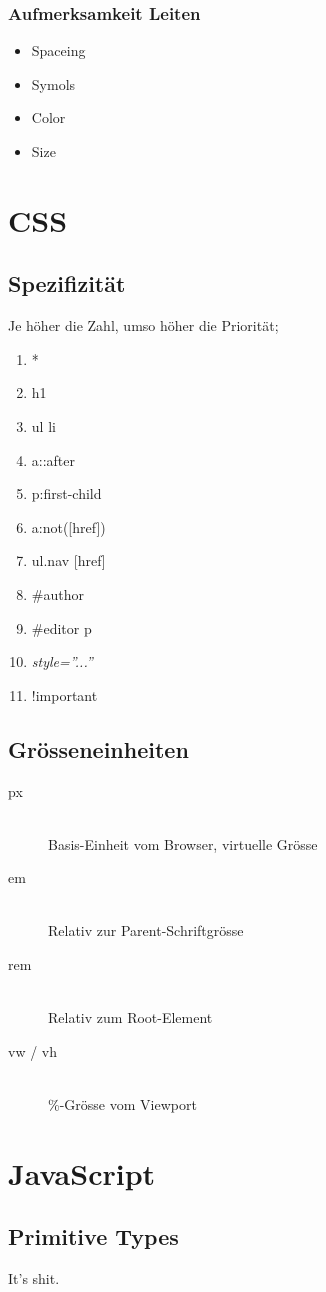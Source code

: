 \subsubsection{Aufmerksamkeit Leiten}

\begin{itemize}
	\item Spaceing
	\item Symols
	\item Color
	\item Size
\end{itemize}

\section{CSS}

\subsection{Spezifizität}

Je höher die Zahl, umso höher die Priorität;

\begin{enumerate}
	\item *
	\item h1
	\item ul li
	\item a::after
	\item p:first-child
	\item a:not([href])
	\item ul.nav [href]
	\item \#author
	\item \#editor p
	\item \emph{style=''...''}
	\item !important
\end{enumerate}

\subsection{Grösseneinheiten}

\begin{description}
	\item[px] \hfill \\
		Basis-Einheit vom Browser, virtuelle Grösse
	\item[em] \hfill \\
		Relativ zur Parent-Schriftgrösse
	\item[rem] \hfill \\
		Relativ zum Root-Element
	\item[vw / vh] \hfill \\
		\%-Grösse vom Viewport
\end{description}

\section{JavaScript}

\subsection{Primitive Types}
It's shit.

